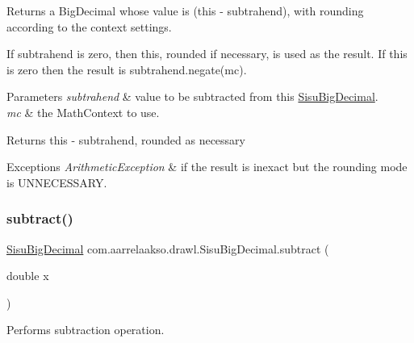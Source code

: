 Returns a Big\+Decimal whose value is (this -\/ subtrahend), with rounding according to the context settings. 

If subtrahend is zero, then this, rounded if necessary, is used as the result. If this is zero then the result is subtrahend.\+negate(mc).


\begin{DoxyParams}{Parameters}
{\em subtrahend} & value to be subtracted from this \hyperlink{classcom_1_1aarrelaakso_1_1drawl_1_1_sisu_big_decimal}{Sisu\+Big\+Decimal}. \\
\hline
{\em mc} & the Math\+Context to use. \\
\hline
\end{DoxyParams}
\begin{DoxyReturn}{Returns}
this -\/ subtrahend, rounded as necessary 
\end{DoxyReturn}

\begin{DoxyExceptions}{Exceptions}
{\em Arithmetic\+Exception} & if the result is inexact but the rounding mode is U\+N\+N\+E\+C\+E\+S\+S\+A\+RY. \\
\hline
\end{DoxyExceptions}
\mbox{\label{classcom_1_1aarrelaakso_1_1drawl_1_1_sisu_big_decimal_abde4af9e4686abbbdb1539505f7223ae}} 
\subsubsection{\texorpdfstring{subtract()}{subtract()}\hspace{0.1cm}{\footnotesize\ttfamily [3/3]}}
{\footnotesize\ttfamily \hyperlink{classcom_1_1aarrelaakso_1_1drawl_1_1_sisu_big_decimal}{Sisu\+Big\+Decimal} com.\+aarrelaakso.\+drawl.\+Sisu\+Big\+Decimal.\+subtract (\begin{DoxyParamCaption}\item[{double}]{x }\end{DoxyParamCaption})\hspace{0.3cm}{\ttfamily [protected]}}



Performs subtraction operation. 


